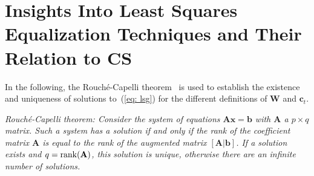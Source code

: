 \documentclass[11pt,draftcls,onecolumn]{IEEEtran}
\begin{document}
\section{Insights Into Least Squares Equalization Techniques and Their Relation to CS}
\label{sec: theory}
In the following, the Rouch\'{e}-Capelli theorem~\cite{shafarevic_algebra_book} is used to establish the existence and uniqueness of solutions to~(\ref{eq: lsg}) for the different definitions of $\mathbf{W}$ and $\mathbf{c}_t$.

{\textit{Rouch\'{e}-Capelli theorem: \enspace
Consider the system of equations $\mathbf{A}\mathbf{x} = \mathbf{b}$ with $\mathbf{A}$ a $p \times q$ matrix. Such a system has a solution if and only if the rank of the coefficient matrix $\mathbf{A}$ is equal to the rank of the augmented matrix $[\mathbf{A}|\mathbf{b}]$. 
If a solution exists and $q = {\rm rank}(\mathbf{A})$, this solution is unique, otherwise there are an infinite number of solutions.
}}
\end{document}
